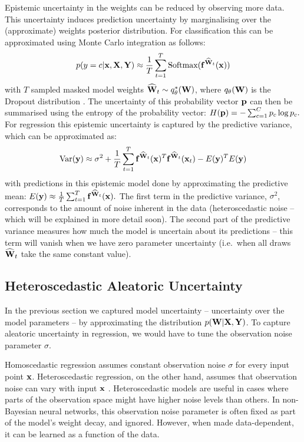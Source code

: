 Epistemic uncertainty in the weights can be reduced by observing more data. This uncertainty induces prediction uncertainty by marginalising over the (approximate) weights posterior distribution. For classification this can be approximated using Monte Carlo integration as follows:
\begin{equation}
p(y=c | \mathbf{x}, \mathbf{X}, \mathbf{Y}) 
\approx
\frac{1}{T} \sum_{t=1}^T \text{Softmax}(\mathbf{f}^{{\widehat{\mathbf{W}}}_t}(\mathbf{x}))
\end{equation}
with $T$ sampled masked model weights ${\widehat{\mathbf{W}}}_t \sim q_\theta^*(\mathbf{W})$, where $q_\theta(\mathbf{W})$ is the Dropout distribution \citep{gal2016thesis}. 
The uncertainty of this probability vector $\mathbf{p}$ can then be summarised using the entropy of the probability vector:
$H(\mathbf{p}) = - \sum_{c=1}^C p_c \log p_c.$
For regression this epistemic uncertainty is captured by the predictive variance, which can be approximated as:
\begin{equation}
\text{Var}(\mathbf{y}) \approx \sigma^2 + \frac{1}{T} \sum_{t=1}^T \mathbf{f}^{{\widehat{\mathbf{W}}}_t}(\mathbf{x})^T \mathbf{f}^{{\widehat{\mathbf{W}}}_t}(\mathbf{x}_t) - E(\mathbf{y})^T E(\mathbf{y})
\end{equation}
with predictions in this epistemic model done by approximating the predictive mean: 
$E(\mathbf{y}) \approx \frac{1}{T} \sum_{t=1}^T \mathbf{f}^{{\widehat{\mathbf{W}}}_t}(\mathbf{x}).$
The first term in the predictive variance, $\sigma^2$, corresponds to the amount of noise inherent in the data (heteroscedastic noise -- which will be explained in more detail soon). The second part of the predictive variance measures how much the model is uncertain about its predictions -- this term will vanish when we have zero parameter uncertainty (i.e.\ when all draws ${\widehat{\mathbf{W}}}_t$ take the same constant value). 

\subsection{Heteroscedastic Aleatoric Uncertainty}
\label{sect:hetero}

In the previous section we captured model uncertainty -- uncertainty over the model parameters -- by approximating the distribution $p(\mathbf{W} | \mathbf{X}, \mathbf{Y})$. To capture aleatoric uncertainty in regression, we would have to tune the observation noise parameter $\sigma$.

Homoscedastic regression assumes constant observation noise $\sigma$ for every input point $\mathbf{x}$. Heteroscedastic regression, on the other hand, assumes that observation noise can vary with input $\mathbf{x}$ \citep{nix1994estimating, le2005heteroscedastic}. Heteroscedastic models are useful in cases where parts of the observation space might have higher noise levels than others.
In non-Bayesian neural networks, this observation noise parameter is often fixed as part of the model's weight decay, and ignored. However, when made data-dependent, it can be learned as a function of the data.

